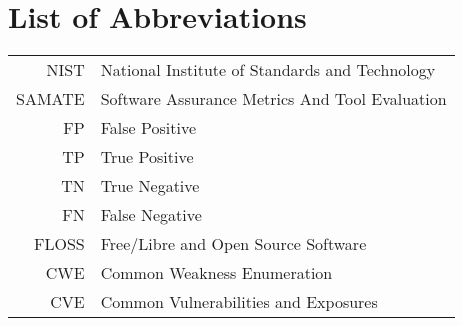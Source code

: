 \chapter*{List of Abbreviations}
\begin{tabular}{rl}
  NIST & National Institute of Standards and Technology \\
  SAMATE & Software Assurance Metrics And Tool Evaluation \\
  FP & False Positive \\
  TP & True Positive \\
  TN & True Negative \\
  FN & False Negative \\
  FLOSS & Free/Libre and Open Source Software \\
  CWE & Common Weakness Enumeration \\
  CVE & Common Vulnerabilities and Exposures
\end{tabular}



\listoffigures

\listoftables
